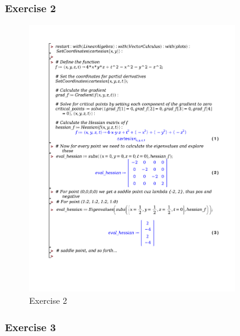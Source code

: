 \documentclass[a4paper]{report}
\begin{document}


\subsubsection{Exercise 2}

\begin{figure}[H]
	\centering
	\includegraphics[width=0.8\textwidth]{exercises/bord_4_ex_2.pdf}
	\caption{Exercise 2}
	\label{fig:bord_4_ex_2}
\end{figure}

\subsubsection{Exercise 3}
\end{document}
